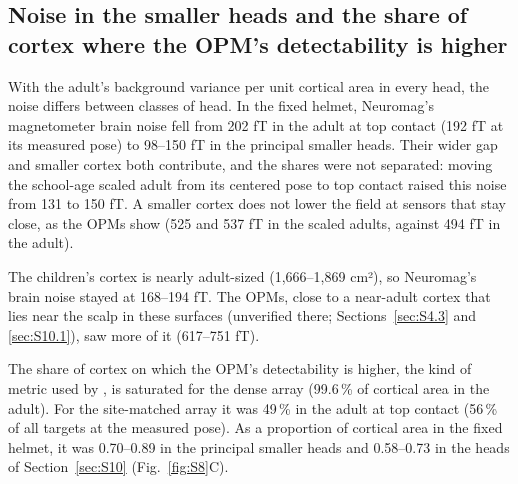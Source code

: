 \documentclass[preprint,12pt,authoryear,a4paper]{elsarticle}
\begin{document}
\subsection{Noise in the smaller heads and the share of cortex where the OPM's detectability is higher}\label{sec:S5.5}

With the adult's background variance per unit cortical area in every head, the noise differs between classes of head. In the fixed helmet, Neuromag's magnetometer brain noise fell from 202 fT in the adult at top contact (192 fT at its measured pose) to 98–150 fT in the principal smaller heads. Their wider gap and smaller cortex both contribute, and the shares were not separated: moving the school-age scaled adult from its centered pose to top contact raised this noise from 131 to 150 fT. A smaller cortex does not lower the field at sensors that stay close, as the OPMs show (525 and 537 fT in the scaled adults, against 494 fT in the adult).

The children's cortex is nearly adult-sized (1,666–1,869 cm²), so Neuromag's brain noise stayed at 168–194 fT. The OPMs, close to a near-adult cortex that lies near the scalp in these surfaces (unverified there; Sections~\ref{sec:S4.3} and \ref{sec:S10.1}), saw more of it (617–751 fT).

The share of cortex on which the OPM's detectability is higher, the kind of metric used by \citet{jas2026}, is saturated for the dense array (99.6\,\% of cortical area in the adult). For the site-matched array it was 49\,\% in the adult at top contact (56\,\% of all targets at the measured pose). As a proportion of cortical area in the fixed helmet, it was 0.70–0.89 in the principal smaller heads and 0.58–0.73 in the heads of Section~\ref{sec:S10} (Fig.~\ref{fig:S8}C).
\end{document}
